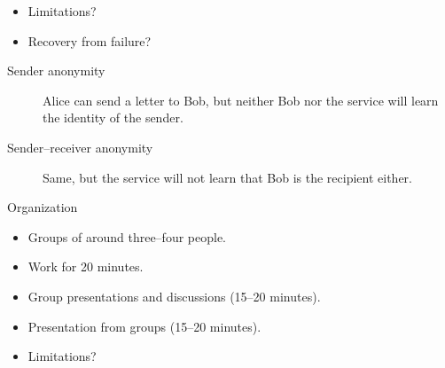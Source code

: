{\begin{frame}
    \begin{question}
      \begin{itemize}
        \item Limitations?
        \item Recovery from failure?
      \end{itemize}
    \end{question}
  \end{frame}

  \begin{frame}
    \begin{exercise}
      \begin{description}
        \item[Sender anonymity]
          Alice can send a letter to Bob, but neither Bob nor the service will 
          learn the identity of the sender.

        \item[Sender--receiver anonymity]
          Same, but the service will not learn that Bob is the recipient 
          either.
      \end{description}
    \end{exercise}

    \pause

    \begin{block}{Organization}
      \begin{itemize}
        \item Groups of around three--four people.
        \item Work for 20 minutes.
        \item Group presentations and discussions (15--20 minutes).
      \end{itemize}
    \end{block}
  \end{frame}

  \begin{frame}
    \begin{solution}
      \begin{itemize}
        \item Presentation from groups (15--20 minutes).
      \end{itemize}
    \end{solution}

    \begin{question}
      \begin{itemize}
        \item Limitations?
      \end{itemize}
    \end{question}
  \end{frame}
}

